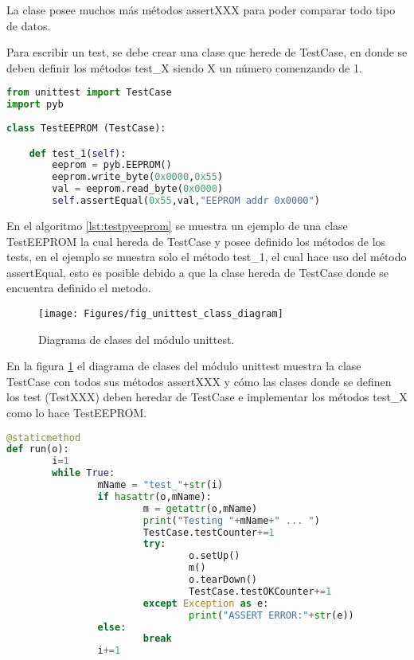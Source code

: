 La clase posee muchos más métodos assertXXX para poder comparar todo tipo de datos.

Para escribir un test, se debe crear una clase que herede de TestCase, en donde se deben definir los métodos test\_X siendo X un número comenzando de 1.

\begin{lstlisting}[label={lst:testpyeeprom},caption=Clase que hereda de TestCase donde se definen los métodos de test para la EEPROM., language={python}]
from unittest import TestCase
import pyb
  
class TestEEPROM (TestCase):

    def test_1(self):
        eeprom = pyb.EEPROM()
        eeprom.write_byte(0x0000,0x55)
        val = eeprom.read_byte(0x0000)
        self.assertEqual(0x55,val,"EEPROM addr 0x0000")       
\end{lstlisting}

En el algoritmo \ref{lst:testpyeeprom} se muestra un ejemplo de una clase TestEEPROM la cual hereda de TestCase y posee definido los métodos de los tests, en el ejemplo se muestra solo el método test\_1, el cual hace uso del método assertEqual, esto es posible debido a que la clase hereda de TestCase donde se encuentra definido el metodo.

\begin{figure}[ht]
  \centering
    \texttt{[image: Figures/fig\_unittest\_class\_diagram]}
  \caption{Diagrama de clases del módulo unittest.}
  \label{fig:unittestpythonclassd}
\end{figure}

En la figura \ref{fig:unittestpythonclassd} el diagrama de clases del módulo unittest muestra la clase TestCase con todos sus métodos assertXXX y cómo las clases donde se definen los test (TestXXX) deben heredar de TestCase e implementar los métodos test\_X como lo hace TestEEPROM.

\begin{lstlisting}[label={lst:utestsrun},caption=Método que ejecuta los métodos de test en la biblioteca unittest.py implementada., language={python}]
@staticmethod
def run(o):
		i=1
		while True:
				mName = "test_"+str(i)
				if hasattr(o,mName):
						m = getattr(o,mName)
						print("Testing "+mName+" ... ")
						TestCase.testCounter+=1
						try:
								o.setUp()
								m()
								o.tearDown()
								TestCase.testOKCounter+=1
						except Exception as e:
								print("ASSERT ERROR:"+str(e))
				else:
						break
				i+=1
\end{lstlisting}

